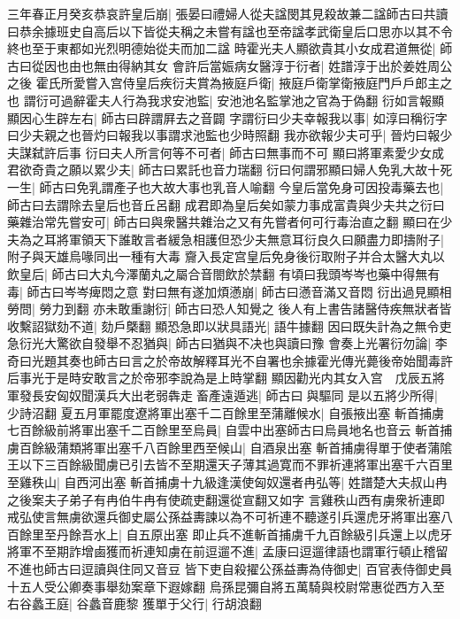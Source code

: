 三年春正月癸亥恭哀許皇后崩|{
	張晏曰禮婦人從夫諡閔其見殺故兼二諡師古曰共讀曰恭余據班史自高后以下皆從夫稱之未嘗有諡也至帝諡孝武衛皇后口思亦以其不令終也至于東都如光烈明德始從夫而加二諡}
時霍光夫人顯欲貴其小女成君道無從|{
	師古曰從因也由也無由得納其女}
會許后當娠病女醫淳于衍者|{
	姓譜淳于出於姜姓周公之後}
霍氏所愛嘗入宫侍皇后疾衍夫賞為掖庭戶衛|{
	掖庭戶衛掌衛掖庭門戶戶郎主之也}
謂衍可過辭霍夫人行為我求安池監|{
	安池池名監掌池之官為于偽翻}
衍如言報顯顯因心生辟左右|{
	師古曰辟謂屛去之音闢}
字謂衍曰少夫幸報我以事|{
	如淳曰稱衍字曰少夫親之也晉灼曰報我以事謂求池監也少時照翻}
我亦欲報少夫可乎|{
	晉灼曰報少夫謀弑許后事}
衍曰夫人所言何等不可者|{
	師古曰無事而不可}
顯曰將軍素愛少女成君欲奇貴之願以累少夫|{
	師古曰累託也音力瑞翻}
衍曰何謂邪顯曰婦人免乳大故十死一生|{
	師古曰免乳謂產子也大故大事也乳音人喻翻}
今皇后當免身可因投毒藥去也|{
	師古曰去謂除去皇后也音丘呂翻}
成君即為皇后矣如蒙力事成富貴與少夫共之衍曰藥雜治常先嘗安可|{
	師古曰與衆醫共雜治之又有先嘗者何可行毒治直之翻}
顯曰在少夫為之耳將軍領天下誰敢言者緩急相護但恐少夫無意耳衍良久曰願盡力即擣附子|{
	附子與天雄烏喙同出一種有大毒}
齎入長定宫皇后免身後衍取附子并合太醫大丸以飲皇后|{
	師古曰大丸今澤蘭丸之屬合音閤飲於禁翻}
有頃曰我頭岑岑也藥中得無有毒|{
	師古曰岑岑痺悶之意}
對曰無有遂加煩懣崩|{
	師古曰懣音滿又音悶}
衍出過見顯相勞問|{
	勞力到翻}
亦未敢重謝衍|{
	師古曰恐人知覺之}
後人有上書告諸醫侍疾無狀者皆收繫詔獄劾不道|{
	劾戶槩翻}
顯恐急即以狀具語光|{
	語牛據翻}
因曰既失計為之無令吏急衍光大驚欲自發舉不忍猶與|{
	師古曰猶與不决也與讀曰豫}
會奏上光署衍勿論|{
	李奇曰光題其奏也師古曰言之於帝故解釋耳光不自署也余據霍光傳光薨後帝始聞毒許后事光于是時安敢言之於帝邪李說為是上時掌翻}
顯因勸光内其女入宫　戊辰五將軍發長安匈奴聞漢兵大出老弱犇走畜產遠遁逃|{
	師古曰與驅同}
是以五將少所得|{
	少詩沼翻}
夏五月軍罷度遼將軍出塞千二百餘里至蒲離候水|{
	自張掖出塞}
斬首捕虜七百餘級前將軍出塞千二百餘里至烏員|{
	自雲中出塞師古曰烏員地名也音云}
斬首捕虜百餘級蒲類將軍出塞千八百餘里西至候山|{
	自酒泉出塞}
斬首捕虜得單于使者蒲隂王以下三百餘級聞虜已引去皆不至期還天子薄其過寛而不罪祈連將軍出塞千六百里至雞秩山|{
	自西河出塞}
斬首捕虜十九級逢漢使匈奴還者冉弘等|{
	姓譜楚大夫叔山冉之後案夫子弟子有冉伯牛冉有使疏吏翻還從宣翻又如字}
言雞秩山西有虜衆祈連即戒弘使言無虜欲還兵御史屬公孫益夀諫以為不可祈連不聽遂引兵還虎牙將軍出塞八百餘里至丹餘吾水上|{
	自五原出塞}
即止兵不進斬首捕虜千九百餘級引兵還上以虎牙將軍不至期詐增鹵獲而祈連知虜在前逗遛不進|{
	孟康曰逗遛律語也謂軍行頓止稽留不進也師古曰逗讀與住同又音豆}
皆下吏自殺擢公孫益夀為侍御史|{
	百官表侍御史員十五人受公卿奏事舉劾案章下遐嫁翻}
烏孫昆彌自將五萬騎與校尉常惠從西方入至右谷蠡王庭|{
	谷蠡音鹿黎}
獲單于父行|{
	行胡浪翻}
